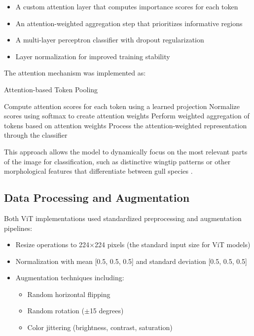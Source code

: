 \begin{itemize}
    \item A custom attention layer that computes importance scores for each token
    \item An attention-weighted aggregation step that prioritizes informative regions
    \item A multi-layer perceptron classifier with dropout regularization
    \item Layer normalization for improved training stability
\end{itemize}

The attention mechanism was implemented as:

\begin{algorithm}
\caption{Attention-based Token Pooling}
\begin{algorithmic}[1]
\State Compute attention scores for each token using a learned projection
\State Normalize scores using softmax to create attention weights
\State Perform weighted aggregation of tokens based on attention weights
\State Process the attention-weighted representation through the classifier
\end{algorithmic}
\end{algorithm}

This approach allows the model to dynamically focus on the most relevant parts of the image for classification, such as distinctive wingtip patterns or other morphological features that differentiate between gull species \citep{stassin2024explainability}.

\subsection{Data Processing and Augmentation}

Both ViT implementations used standardized preprocessing and augmentation pipelines:

\begin{itemize}
    \item Resize operations to 224$\times$224 pixels (the standard input size for ViT models)
    \item Normalization with mean [0.5, 0.5, 0.5] and standard deviation [0.5, 0.5, 0.5]
    \item Augmentation techniques including:
    \begin{itemize}
        \item Random horizontal flipping
        \item Random rotation ($\pm$15 degrees)
        \item Color jittering (brightness, contrast, saturation)
    \end{itemize}
\end{itemize}

